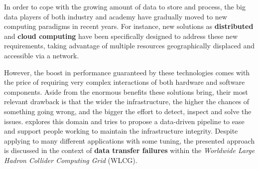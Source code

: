 In order to cope with the growing amount of data to store and process, the big data players of both industry and academy have gradually moved to new computing paradigms in recent years. 
For instance, new solutions as \textbf{distributed} and \textbf{cloud computing} \cite{kshemkalyani2011distributed, wang2010cloud} have been specifically designed to address these new requirements, taking advantage of multiple resources geographically displaced and accessible via a network.

However, the boost in performance guaranteed by these technologies comes with the price of requiring very complex interactions of both hardware and software components. 
Aside from the enormous benefits these solutions bring, their most relevant drawback is that the wider the infrastructure, the higher the chances of something going wrong, and the bigger the effort to detect, inspect and solve the issues.
 explores this domain and tries to propose a data-driven pipeline to ease and support people working to maintain the infrastructure integrity.
Despite applying to many different applications with some tuning, the presented approach is discussed in the context of \textbf{data transfer failures} within the \emph{Worldwide Large Hadron Collider Computing Grid} (WLCG).


